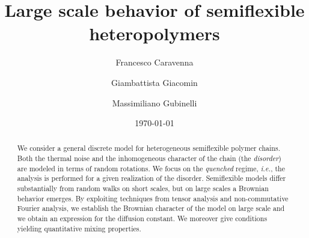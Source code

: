 \documentclass[a4paper,reqno,11pt]{amsart}
\numberwithin{equation}{section}
\begin{document}
\title[Disordered semiflexible polymers]{Large scale behavior of semiflexible heteropolymers}

\author{Francesco Caravenna}

\address{Dipartimento di Matematica Pura e Applicata, Universit\`a
degli Studi di Padova,
via \mbox{Trieste} 63, 35121 Padova, Italy}


\author{Giambattista Giacomin}
\address{
Universit\'e Paris  Diderot (Paris 7) and Laboratoire de Probabilit{\'e}s et Mod\`eles Al\'eatoires (CNRS U.M.R. 7599),
                             UFR de Math\'ematiques,
                             case 7012 (site Chevaleret)
                             75205 PARIS Cedex 13, France
}


\author{Massimiliano Gubinelli}
\address{Equipe de probabilit\'es, statistique et mod\'elisation, Universit\'e de Paris-Sud,
B\^atiment 425, 91405 ORSAY Cedex, France}





\begin{abstract}
We consider a general discrete model for heterogeneous semiflexible polymer chains.
Both the thermal noise and the inhomogeneous
character of the chain (the {\sl disorder}) are modeled in terms of random rotations.
We focus on the {\sl quenched} regime, {\sl i.e.}, the analysis is performed
for a given realization of the disorder. Semiflexible models differ substantially from
random walks on short scales, but on large scales a Brownian behavior emerges.
By exploiting techniques from tensor analysis and non-commutative Fourier analysis,
we establish the Brownian character of the model on large scale
and we obtain an expression for the diffusion constant. We moreover give conditions
yielding quantitative mixing properties.
\end{abstract}

\date{\today}






\maketitle
\end{document}
